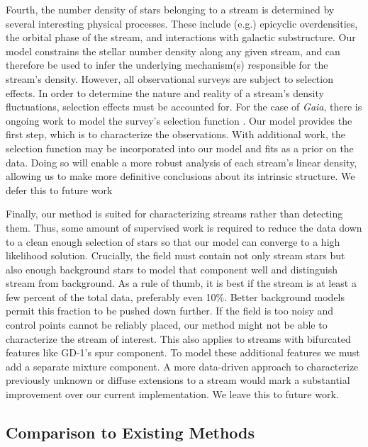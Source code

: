 \documentclass[twocolumn, linenumbers]{aastex631}
\newcommand{\dataarchive}[1]{\textit{#1}}
\newcommand{\Gaia}{\dataarchive{Gaia}}
\begin{document}
        Fourth, the number density of stars belonging to a stream is determined
        by several interesting physical processes. These include (e.g.)
        epicyclic overdensities, the orbital phase of the stream, and
        interactions with galactic substructure. Our model constrains the
        stellar number density along any given stream, and can therefore be used
        to infer the underlying mechanism(s) responsible for the stream’s
        density. However, all observational surveys are subject to selection
        effects. In order to determine the nature and reality of a stream’s
        density fluctuations, selection effects must be accounted for. For the
        case of \Gaia{}, there is ongoing work to model the survey’s selection
        function \citep{Cantat-Gaudin+2023}. Our model provides the first step,
        which is to characterize the observations.  With additional work, the
        selection function may be incorporated into our model and fits as a
        prior on the data.  Doing so will enable a more robust analysis of each
        stream's linear density, allowing us to make more definitive conclusions
        about its intrinsic structure. We defer this to future work
    
        Finally, our method is suited for characterizing streams rather than
        detecting them. Thus, some amount of supervised work is required to
        reduce the data down to a clean enough selection of stars so that our
        model can converge to a high likelihood solution. Crucially, the field
        must contain not only stream stars but also enough background stars to
        model that component well and distinguish stream from background. As a
        rule of thumb, it is best if the stream is at least a few percent of the
        total data, preferably even 10\%. Better background models permit this
        fraction to be pushed down further.  If the field is too noisy and
        control points cannot be reliably placed, our method might not be able
        to characterize the stream of interest.  This also applies to streams
        with bifurcated features like GD-1's spur component. To model these
        additional features we must add a separate mixture component. A more
        data-driven approach to characterize previously unknown or diffuse
        extensions to a stream would mark a substantial improvement over our
        current implementation. We leave this to future work.
        

    \subsection{Comparison to Existing Methods} \label{sub:comparison}
\end{document}
